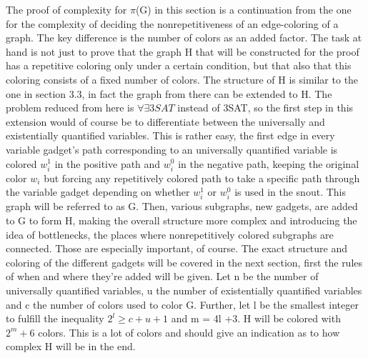 \documentclass[12pt,a4paper]{article}
\begin{document}
The proof of complexity for $\pi$(G) in this section is a continuation from the one for the complexity of deciding the nonrepetitiveness of an edge-coloring of a graph. The key difference is the number of colors as an added factor. The task at hand is not just to prove that the graph H that will be constructed for the proof has a repetitive coloring only under a certain condition, but that also that this coloring consists of a fixed number of colors. 
The structure of H is similar to the one in section 3.3, in fact the graph from there can be extended to H. The problem reduced from here is $\forall \exists 3SAT$ instead of 3SAT, so the first step in this extension would of course be to differentiate between the universally and existentially quantified variables. This is rather easy, the first edge in every variable gadget's path corresponding to an universally quantified variable is colored $w^1_i$ in the positive path and $w^0_i$ in the negative path, keeping the original color $w_i$ but forcing any repetitively colored path to take a specific path through the variable gadget depending on whether $w^1_i$ or $w^0_i$ is used in the snout. This graph will be referred to as G.
\newline
Then, various subgraphs, new gadgets, are added to G to form H, making the overall structure more complex and introducing the idea of bottlenecks, the places where nonrepetitively colored subgraphs are connected. Those are especially important, of course. The exact structure and coloring of the different gadgets will be covered in the next section, first the rules of when and where they're added will be given. Let n be the number of universally quantified variables, u the number of existentially quantified variables and c the number of colors used to color G. Further, let l be the smallest integer to fulfill the inequality $2^l \geq c + u + 1$ and m = 4l +3. H will be colored with $2^m +6$ colors. This is a lot of colors and should give an indication as to how complex H will be in the end.
\newline
\end{document}

